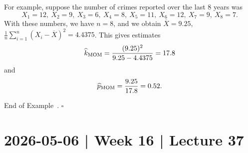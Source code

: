 \documentclass[10pt]{article}
\theoremstyle{definition}
\newtheorem{example}[theorem]{Example}
\renewenvironment{example}
{\begin{oldexample}}
  {\par\smallskip\hfill   End of Example~\theexample. $\square$    \par\end{oldexample}}
\newcommand{\1}[1]{\textbf{1}_{\left[#1\right]}} %
\begin{document}
\begin{example}[Crimes]
  For example, suppose the number of crimes reported over the last 8 years was
  \begin{equation*}
    X_{1} = 12, \ X_{2}= 9,\ X_{3}=6,\ X_{4}=8,\ X_{5}=11,\ X_{6}=12,\ X_{7}=9,\ X_{8}=7.
  \end{equation*}
  With these numbers, we have $n=8$, and we obtain $\overline{X}= 9.25$,
  $\frac{1}{n}\sum_{i=1}^{n} (X_{i}-\overline{X})^{2}=4.4375$. This gives estimates
  \begin{equation*}
    \widehat{k}_{\rm MOM}= \frac{(9.25)^{2}}{9.25 - 4.4375} = 17.8
  \end{equation*}
  and
  \begin{equation*}
    \widehat{p}_{\rm MOM} = \frac{9.25}{17.8}= 0.52.
  \end{equation*}
\end{example}
\newpage
\section{2026-05-06 | Week 16 | Lecture 37}
\end{document}
